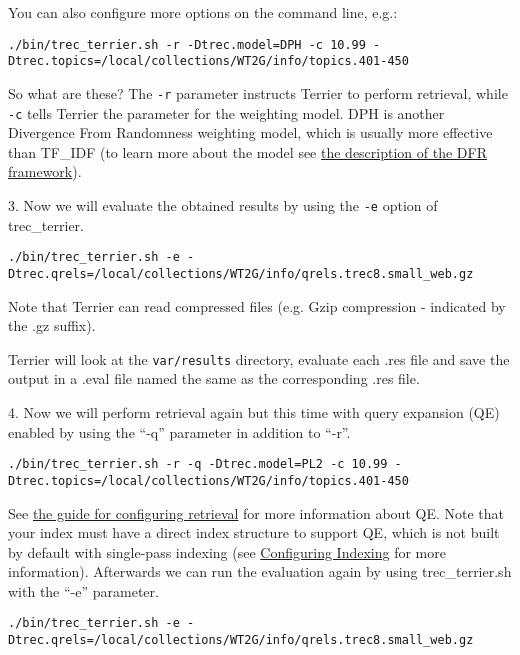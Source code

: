 You can also configure more options on the command line, e.g.:

\begin{verbatim}
./bin/trec_terrier.sh -r -Dtrec.model=DPH -c 10.99 -Dtrec.topics=/local/collections/WT2G/info/topics.401-450
\end{verbatim}

So what are these? The \texttt{-r} parameter instructs Terrier to
perform retrieval, while \texttt{-c} tells Terrier the parameter for the
weighting model. DPH is another Divergence From Randomness weighting
model, which is usually more effective than TF\_IDF (to learn more about
the model see \href{dfr_description.html}{the description of the DFR
framework}).

3. Now we will evaluate the obtained results by using the \texttt{-e}
option of trec\_terrier.

\begin{verbatim}
./bin/trec_terrier.sh -e -Dtrec.qrels=/local/collections/WT2G/info/qrels.trec8.small_web.gz
\end{verbatim}

Note that Terrier can read compressed files (e.g. Gzip compression -
indicated by the .gz suffix).

Terrier will look at the \texttt{var/results} directory, evaluate each
.res file and save the output in a .eval file named the same as the
corresponding .res file.

4. Now we will perform retrieval again but this time with query
expansion (QE) enabled by using the ``-q'' parameter in addition to
``-r''.

\begin{verbatim}
./bin/trec_terrier.sh -r -q -Dtrec.model=PL2 -c 10.99 -Dtrec.topics=/local/collections/WT2G/info/topics.401-450
\end{verbatim}

See \href{configure_retrieval.html}{the guide for configuring retrieval}
for more information about QE. Note that your index must have a direct
index structure to support QE, which is not built by default with
single-pass indexing (see \href{configure_indexing.html}{Configuring
Indexing} for more information). Afterwards we can run the evaluation
again by using trec\_terrier.sh with the ``-e'' parameter.

\begin{verbatim}
./bin/trec_terrier.sh -e -Dtrec.qrels=/local/collections/WT2G/info/qrels.trec8.small_web.gz
\end{verbatim}

